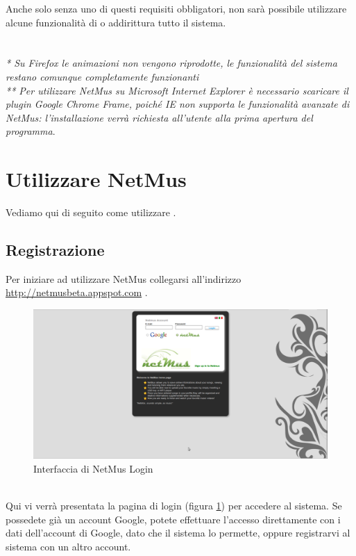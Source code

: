 Anche solo senza uno di questi requisiti obbligatori,
non sar\`a possibile utilizzare alcune funzionalit\`a di  o
addirittura tutto il sistema.\\
\\
\\

\emph{* Su Firefox le animazioni non vengono riprodotte, le funzionalit\`a del
sistema restano comunque completamente funzionanti}\\
\emph{** Per utilizzare NetMus su Microsoft Internet Explorer \`e
necessario scaricare il plugin Google Chrome Frame, poich\'e IE non supporta le
funzionalit\`a avanzate di NetMus: l'installazione verr\`a richiesta all'utente
alla prima apertura del programma}.

\newpage
\section{Utilizzare NetMus}
Vediamo qui di seguito come utilizzare .

\subsection{Registrazione}
Per iniziare ad utilizzare NetMus collegarsi all'indirizzo
\url{http://netmusbeta.appspot.com} . \\
\begin{figure}[!htbp]
  \centering
  \includegraphics[width=14cm]{img/MU/login.png}
\caption{Interfaccia di NetMus Login}
\label{fig:login}
\end{figure}
\\
Qui vi verr\`a presentata la pagina di login (figura \ref{fig:login}) per
accedere al sistema. Se possedete gi\`a un account Google, potete effettuare
l'accesso direttamente con i dati dell'account di Google, dato che il sistema lo
permette, oppure registrarvi al sistema con un altro account.

